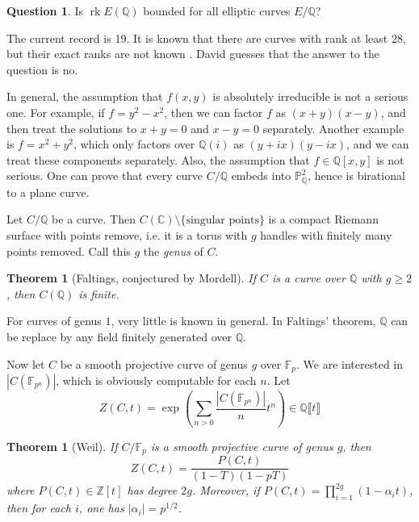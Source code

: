 \documentclass{article}
\newtheorem{theorem}[subsection]{Theorem}
\theoremstyle{definition}
\newtheorem{question}[subsection]{Question}
\begin{document}
\begin{question}
Is $\operatorname{rk} E(\mathbb{Q})$ bounded for all elliptic curves 
$E/\mathbb{Q}$?
\end{question}

The current record is 19. It is known that there are curves with rank at least 
$28$, but their exact ranks are not known \cite{du}. David guesses that 
the answer to the question is no. 

In general, the assumption that $f(x,y)$ is absolutely irreducible is not a 
serious one. For example, if $f=y^2-x^2$, then we can factor $f$ as 
$(x+y)(x-y)$, and then treat the solutions to $x+y=0$ and $x-y=0$ separately. 
Another example is $f=x^2+y^2$, which only factors over $\mathbb{Q}(i)$ as 
$(y+i x)(y-i x)$, and we can treat these components separately. Also, the 
assumption that $f\in \mathbb{Q}[x,y]$ is not serious. One can prove that 
every curve $C/\mathbb{Q}$ embeds into $\mathbb{P}^2_\mathbb{Q}$, hence is 
birational to a plane curve. 

Let $C/\mathbb{Q}$ be a curve. Then 
$C(\mathbb{C})\setminus \{\text{singular points}\}$ is a compact Riemann 
surface with points remove, i.e. it is a torus with $g$ handles with finitely 
many points removed. Call this $g$ the \emph{genus} of $C$. 

\begin{theorem}[Faltings, conjectured by Mordell]
If $C$ is a curve over $\mathbb{Q}$ with $g\geqslant 2$, then $C(\mathbb{Q})$ 
is finite. 
\end{theorem}

For curves of genus $1$, very little is known in general. In Faltings' 
theorem, $\mathbb{Q}$ can be replace by any field finitely generated over 
$\mathbb{Q}$. 

Now let $C$ be a smooth projective curve of genus $g$ over $\mathbb{F}_p$. 
We are interested in $|C(\mathbb{F}_{p^n})|$, which is obviously computable 
for each $n$. Let 
\[
  Z(C,t) = \exp\left( \sum_{n>0} \frac{|C(\mathbb{F}_{p^n})|}{n} t^n \right) \in \mathbb{Q}\llbracket t\rrbracket 
\]

\begin{theorem}[Weil]
If $C/\mathbb{F}_p$ is a smooth projective curve of genus $g$, then 
\[
  Z(C,t) = \frac{P(C,t)}{(1-T)(1-p T)}
\]
where $P(C,t)\in \mathbb{Z}[t]$ has degree $2 g$. Moreover, if 
$P(C,t) = \prod_{i=1}^{2 g} (1-\alpha_i t)$, then for each $i$, one has 
$|\alpha_i|=p^{1/2}$. 
\end{theorem}
\end{document}
